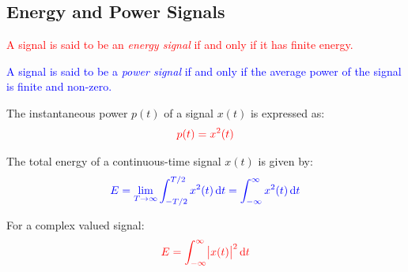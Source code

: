 \documentclass[
  12pt,
  a4paper,
]{report}
\newcommand{\bluetext}[1]{\textcolor{blue}{#1}}
\begin{document}
\subsection{Energy and Power Signals}\label{energy-and-power-signals}

\begin{tcolorbox}[colback=boxbodycol, colframe=boxheadcol, title=\bluetext{\textbf{Energy Signals}}]\label{fig:energy-signal-def-tcbox}
    \begin{center}
        \textcolor{red}{A signal is said to be an \emph{energy signal} if and only if it has finite energy.}
    \end{center}
\end{tcolorbox}
\begin{tcolorbox}[colback=boxbodycol, colframe=boxheadcol, title=\textcolor{red}{\textbf{Power Signals}}]\label{fig:power-signal-def-tcbox}
    \begin{center}
        \bluetext{A signal is said to be a \emph{power signal} if and only if the average power of the signal is finite and non-zero.}
    \end{center}
\end{tcolorbox}
\begin{tcolorbox}[colback=boxbodycol, colframe=boxheadcol, title=\textcolor{red}{\textbf{Instantaneous Power}}]\label{fig:instantaneous-power-def}
The instantaneous power \(p(t)\) of a signal \(x(t)\) is expressed as:
    \begin{equation}
        \label{eq:instantaneous-power-def}
        \textcolor{red}{p(t) = x^2(t)}
    \end{equation}
\end{tcolorbox}
\begin{tcolorbox}[colback=boxbodycol, colframe=boxheadcol, title=\textcolor{red}{\textbf{Continuous-Time Signal Energy}}]\label{fig:continuous-time-energy-def}
The total energy of a continuous-time signal \(x(t)\) is given by:
    \begin{equation}
        \label{eq:continuous-time-energy-def}     
        \bluetext{E = \lim_{T \to \infty}\int_{-T/2}^{T/2} x^2(t) \dd{t} = \int_{-\infty}^{\infty} x^2(t) \dd{t}} 
    \end{equation}
\end{tcolorbox}
\begin{tcolorbox}[colback=boxbodycol, colframe=boxheadcol, title=\textcolor{red}{\textbf{Complex Valued Signal Energy}}]\label{fig:complex-signal-energy-def}
For a complex valued signal:
    \begin{equation}
        \label{eq:complex-signal-energy-def}
        \textcolor{red}{E = \int_{-\infty}^{\infty} \abs{x(t)}^2 \dd{t}} 
    \end{equation}
\end{tcolorbox}
\end{document}
